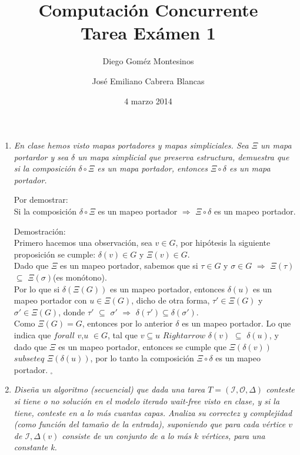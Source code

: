 \documentclass{article}
\title{Computación Concurrente \\ \Large{Tarea Exámen 1}}
\author{
  Diego Goméz Montesinos
  \and
  José Emiliano Cabrera Blancas
  }
\date{4 marzo 2014}
\begin{document}
\maketitle
\begin{enumerate}
  
\item{
    \textsl{
      En clase hemos visto mapas portadores y mapas simpliciales. Sea $\Xi$ un
      mapa portardor y sea $\delta$ un mapa simplicial que preserva estructura,
      demuestra que si la composición $\delta \circ \Xi$ es un mapa portador, 
      entonces $\Xi \circ \delta$ es un mapa portador.\\
    }
    
    Por demostrar:\\
    Si la composición $\delta \circ \Xi$ es un mapeo portador $\Rightarrow$ 
    $\Xi \circ \delta$ es un mapeo portador.
    
    Demostración:\\
    Primero hacemos una observación, sea $v \in G$, por hipótesis la siguiente 
    proposición se cumple: $\delta(v) \in G$ y $\Xi(v) \in G$.\\
    Dado que $\Xi$ es un mapeo portador, sabemos que si $\tau \in G$ y 
    $\sigma \in G$ $\Rightarrow$ $\Xi(\tau)$ $\subseteq$ $\Xi(\sigma)$(es monótono).\\
    Por lo que si $\delta(\Xi(G))$ es un mapeo portador, entonces $\delta(u)$ es un
    mapeo portador con $u \in \Xi(G)$, dicho de otra forma, $\tau' \in \Xi(G)$ y 
    $\sigma' \in \Xi(G)$, donde $\tau'$ $\subseteq$ $\sigma'$ $\Rightarrow$ $\delta(\tau') 
    \subseteq \delta(\sigma')$.\\
    Como $\Xi(G) = G$, entonces por lo anterior $\delta$ es un mapeo portador.
    Lo que indica que $forall$ $v$,$u$ $\in G$, tal que $v \subseteq u$ $Rightarrow$ 
    $\delta(v)$ $\subseteq$ $\delta(u)$, y dado que $\Xi$ es un mapeo portador, entonces
    se cumple que $\Xi(\delta(v))$ $subseteq$ $\Xi(\delta(u))$, por lo tanto la composición
    $\Xi \circ \delta$ es un mapeo portador. $_\square$\\
        
  }
  
\item{
    \textsl{ 
      Diseña un algoritmo (secuencial) que dada una tarea $T = (\mathcal{I},\mathcal{O},\Delta)$
      conteste si tiene o no solución en el modelo iterado wait-free visto en clase, y si la tiene,
      conteste en a lo más cuantas capas. Analiza su correctez y complejidad (como función del tamaño
      de la entrada), suponiendo que para cada vértice $v$ de $\mathcal{I},\Delta(v)$ consiste de 
      un conjunto de a lo más $k$ vértices, para una constante k.
    }

}
\end{enumerate}
\end{document}
